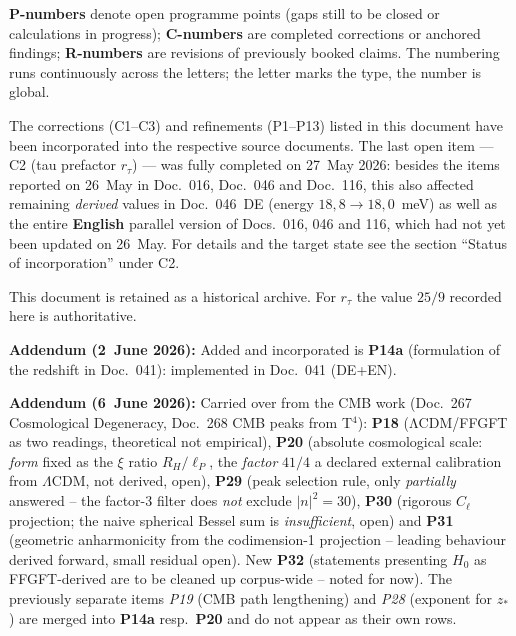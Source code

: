 \medskip


\smallskip
\noindent\textbf{P-numbers} denote open programme points (gaps still to be
closed or calculations in progress); \textbf{C-numbers} are completed
corrections or anchored findings; \textbf{R-numbers} are revisions of
previously booked claims. The numbering runs continuously across the
letters; the letter marks the type, the number is global.

The corrections (C1--C3) and refinements (P1--P13) listed in this document
have been incorporated into the respective source documents. The last open
item --- C2 (tau prefactor $r_\tau$) --- was fully completed on 27~May 2026:
besides the items reported on 26~May in Doc.~016, Doc.~046 and Doc.~116, this
also affected remaining \emph{derived} values in Doc.~046~DE (energy
$18{,}8 \to 18{,}0$~meV) as well as the entire \textbf{English} parallel
version of Docs.~016, 046 and 116, which had not yet been updated on 26~May.
For details and the target state see the section ``Status of incorporation''
under C2.

This document is retained as a historical archive. For $r_\tau$ the value
$25/9$ recorded here is authoritative.

\medskip

\textbf{Addendum (2~June 2026):} Added and incorporated is \textbf{P14a}
(formulation of the redshift in Doc.~041): implemented in Doc.~041 (DE+EN).

\medskip

\textbf{Addendum (6~June 2026):} Carried over from the CMB work (Doc.~267
Cosmological Degeneracy, Doc.~268 CMB peaks from T$^4$): \textbf{P18}
(ΛCDM/FFGFT as two readings, theoretical not empirical),
\textbf{P20} (absolute cosmological scale: \emph{form} fixed as the $\xi$ ratio $R_H/\ell_P$, the \emph{factor} $41/4$ a declared external calibration from $\Lambda$CDM, not derived, open), \textbf{P29} (peak selection rule,
only \emph{partially} answered -- the factor-3 filter does \emph{not} exclude
$|n|^2=30$), \textbf{P30} (rigorous $C_\ell$ projection; the naive spherical
Bessel sum is \emph{insufficient}, open) and \textbf{P31} (geometric
anharmonicity from the codimension-1 projection -- leading behaviour derived
forward, small residual open). New \textbf{P32} (statements presenting $H_0$ as
FFGFT-derived are to be cleaned up corpus-wide -- noted for now). The
previously separate items \emph{P19} (CMB path lengthening) and \emph{P28}
(exponent for $z_*$) are merged into \textbf{P14a} resp.\ \textbf{P20} and do
not appear as their own rows.

